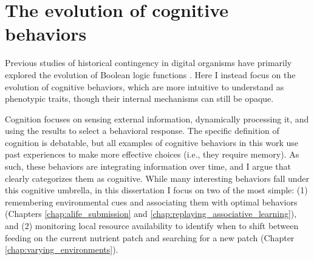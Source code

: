 \section{The evolution of cognitive behaviors}

Previous studies of historical contingency in digital organisms have primarily explored the evolution of Boolean logic functions \citep{wagenaarInfluenceChanceHistory2004a, bundyHowFootprintHistory2021}.
Here I instead focus on the evolution of cognitive behaviors, which are more intuitive to understand as phenotypic traits, though their internal mechanisms can still be opaque.

Cognition focuses on sensing external information, dynamically processing it, and using the results to select a behavioral response.
The specific definition of cognition is debatable, but all examples of cognitive behaviors in this work use past experiences to make more effective choices (i.e., they require memory).
As such, these behaviors are integrating information over time, and I argue that clearly categorizes them as cognitive. 
While many interesting behaviors fall under this cognitive umbrella, in this dissertation I focus on two of the most simple: (1) remembering environmental cues and associating them with optimal behaviors (Chapters \ref{chap:alife_submission} and \ref{chap:replaying_associative_learning}), and (2) monitoring local resource availability to identify when to shift between feeding on the current nutrient patch and searching for a new patch (Chapter \ref{chap:varying_environments}). 

